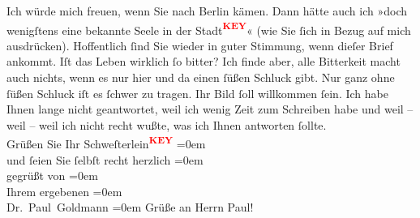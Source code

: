 \begin{ledgroupsized}[t]{13cm}
           \pstart
           Ich würde mich freuen, wenn Sie nach Berlin
               kämen. Dann hätte auch ich »doch wenigſtens eine bekannte Seele in der Stadt\textcolor{red}{\textsuperscript{\textbf{KEY}}}« (wie Sie ſich in Bezug auf mich ausdrücken). {\pb}\pend
           \pstart
           Hoffentlich ſind Sie wieder in guter Stimmung, wenn dieſer Brief ankommt. Iſt das
               Leben wirklich ſo bitter? Ich finde aber, alle Bitterkeit macht auch nichts, wenn es
                  nur hier und da einen ſüßen Schluck gibt. Nur ganz ohne  ſüßen Schluck iſt es ſchwer zu tragen.\pend
           \pstart
           Ihr Bild ſoll willkommen ſein.\pend
           \pstart
           Ich habe Ihnen lange nicht geantwortet, weil ich wenig Zeit zum Schreiben habe
               und weil – weil – weil ich nicht recht wußte, {\pb} was ich Ihnen antworten ſollte.
               {\\[\baselineskip]}Grüßen Sie Ihr Schweſterlein\textcolor{red}{\textsuperscript{\textbf{KEY}}}\pend
           \leftskip=0em{}\pstart
           {\\[\baselineskip]}und ſeien Sie ſelbſt recht herzlich\pend
           \leftskip=0em{}\pstart
           {\\[\baselineskip]}gegrüßt von\pend
           \leftskip=0em{}\pstart
           {\\[\baselineskip]}Ihrem ergebenen\pend
           \leftskip=0em{}\pstart
           {\\[\baselineskip]}\spacefill\mbox{Dr. Paul Goldmann}\pend
           \leftskip=0em{}\pstart
           \pend
           \pstart
           Grüße an Herrn Paul! \pend
           
         
         \endnumbering{}\end{ledgroupsized}\begin{anhang}\end{anhang}\newcommand{\dateiname}{L03526}\newcommand{\titel}{Paul Goldmann an Olga Gussmann, 9. 3. [1901]}\newcommand{\editorInnen}{Martin Anton Müller und Laura Untner}
      